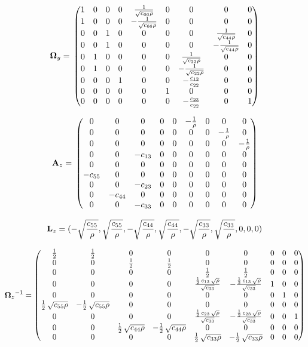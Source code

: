 \[\mathbf{\Omega}_y = \\
\begin{pmatrix}1 & 0 & 0 & 0 & \frac{1}{\sqrt{c_{66} \rho}} & 0 & 0 & 0 & 0\cr 1 & 0 & 0 & 0 & -\frac{1}{\sqrt{c_{66} \rho}} & 0 & 0 & 0 & 0\cr 0 & 0 & 1 & 0 & 0 & 0 & 0 & \frac{1}{\sqrt{c_{44} \rho}} & 0\cr 0 & 0 & 1 & 0 & 0 & 0 & 0 & -\frac{1}{\sqrt{c_{44} \rho}} & 0\cr 0 & 1 & 0 & 0 & 0 & 0 & \frac{1}{\sqrt{c_{22} \rho}} & 0 & 0\cr 0 & 1 & 0 & 0 & 0 & 0 & -\frac{1}{\sqrt{c_{22} \rho}} & 0 & 0\cr 0 & 0 & 0 & 1 & 0 & 0 & -\frac{c_{12}}{c_{22}} & 0 & 0\cr 0 & 0 & 0 & 0 & 0 & 1 & 0 & 0 & 0\cr 0 & 0 & 0 & 0 & 0 & 0 & -\frac{c_{23}}{c_{22}} & 0 & 1\end{pmatrix}\]


\[\mathbf{A}_z = \\
\begin{pmatrix}0 & 0 & 0 & 0 & 0 & -\frac{1}{\rho} & 0 & 0 & 0\cr 0 & 0 & 0 & 0 & 0 & 0 & 0 & -\frac{1}{\rho} & 0\cr 0 & 0 & 0 & 0 & 0 & 0 & 0 & 0 & -\frac{1}{\rho}\cr 0 & 0 & -c_{13} & 0 & 0 & 0 & 0 & 0 & 0\cr 0 & 0 & 0 & 0 & 0 & 0 & 0 & 0 & 0\cr -c_{55} & 0 & 0 & 0 & 0 & 0 & 0 & 0 & 0\cr 0 & 0 & -c_{23} & 0 & 0 & 0 & 0 & 0 & 0\cr 0 & -c_{44} & 0 & 0 & 0 & 0 & 0 & 0 & 0\cr 0 & 0 & -c_{33} & 0 & 0 & 0 & 0 & 0 & 0\end{pmatrix}\]

\[\mathbf{L}_z = \\
(-\sqrt{\frac{c_{55}}{\rho}},\sqrt{\frac{c_{55}}{\rho}},-\sqrt{\frac{c_{44}}{\rho}},\sqrt{\frac{c_{44}}{\rho}},-\sqrt{\frac{c_{33}}{\rho}},\sqrt{\frac{c_{33}}{\rho}},0, 0, 0)\]

\[{\mathbf{\Omega}_z}^{-1} = 
\begin{pmatrix}\frac{1}{2} & \frac{1}{2} & 0 & 0 & 0 & 0 & 0 & 0 & 0\cr 0 & 0 & \frac{1}{2} & \frac{1}{2} & 0 & 0 & 0 & 0 & 0\cr 0 & 0 & 0 & 0 & \frac{1}{2} & \frac{1}{2} & 0 & 0 & 0\cr 0 & 0 & 0 & 0 & \frac{\frac{1}{2}\,c_{13}\,\sqrt{\rho}}{\sqrt{c_{33}}} & -\frac{\frac{1}{2}\,c_{13}\,\sqrt{\rho}}{\sqrt{c_{33}}} & 1 & 0 & 0\cr 0 & 0 & 0 & 0 & 0 & 0 & 0 & 1 & 0\cr \frac{1}{2}\,\sqrt{c_{55} \rho} & -\frac{1}{2}\,\sqrt{c_{55} \rho} & 0 & 0 & 0 & 0 & 0 & 0 & 0\cr 0 & 0 & 0 & 0 & \frac{\frac{1}{2}\,c_{23}\,\sqrt{\rho}}{\sqrt{c_{33}}} & -\frac{\frac{1}{2}\,c_{23}\,\sqrt{\rho}}{\sqrt{c_{33}}} & 0 & 0 & 1\cr 0 & 0 & \frac{1}{2}\,\sqrt{c_{44} \rho} & -\frac{1}{2}\,\sqrt{c_{44} \rho} & 0 & 0 & 0 & 0 & 0\cr 0 & 0 & 0 & 0 & \frac{1}{2}\,\sqrt{c_{33} \rho} & -\frac{1}{2}\,\sqrt{c_{33} \rho} & 0 & 0 & 0\end{pmatrix}\]

